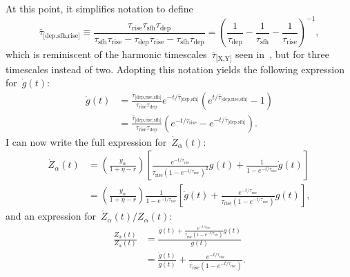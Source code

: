 \documentclass[12pt]{article}
\newcommand{\ddfrac}[2]{\frac{\displaystyle{#1}}{\displaystyle{#2}}}
\newcommand{\timescale}[1]{\ensuremath{\tau_\text{#1}}}
\newcommand{\harmonic}[2]{\ensuremath{\bar{\tau}_\text{[#1,#2]}}}
\newcommand{\hharmonic}[3]{\ensuremath{\bar{\tau}_\text{[#1,#2,#3]}}}
\begin{document}
At this point, it simplifies notation to define
\begin{equation}
\hharmonic{dep}{sfh}{rise} \equiv \frac{
	\timescale{rise}\timescale{sfh}\timescale{dep}
}{
	\timescale{sfh}\timescale{rise} - \timescale{dep}\timescale{rise} -
	\timescale{sfh}\timescale{dep}
} = \left( \frac{1}{\timescale{dep}} - \frac{1}{\timescale{sfh}} -
\frac{1}{\timescale{rise}}\right)^{-1},
\end{equation}
which is reminiscent of the harmonic timescales~$\harmonic{X}{Y}$ seen
in~\citet*{Weinberg2017}, but for three timescales instead of two.
Adopting this notation yields the following expression for~$\dot{g}(t)$:
\begin{equation}
\begin{split}
\dot{g}(t) &= \frac{
	\hharmonic{dep}{rise}{sfh}
}{
	\timescale{rise}\timescale{dep}
} e^{-t / \harmonic{dep}{sfh}} \left(e^{t /
\hharmonic{dep}{rise}{sfh}} - 1\right)
\\
&= \frac{
	\hharmonic{dep}{rise}{sfh}
}{
	\timescale{rise}\timescale{dep}
} \left(e^{-t / \timescale{rise}} - e^{-t / \harmonic{dep}{sfh}}\right).
\end{split}
\end{equation}
I can now write the full expression for~$\dot{Z}_\alpha(t)$:
\begin{subequations}\begin{align}
\dot{Z}_\alpha(t) &= \left(\frac{y_\alpha}{1 + \eta - r}\right)
\left[
\frac{e^{-t / \timescale{rise}}}{
	\timescale{rise} (1 - e^{-t / \timescale{rise}})^2
} g(t) + \frac{1}{1 - e^{-t / \timescale{rise}}} \dot{g}(t)
\right]
\\
&= \left(\frac{y_\alpha}{1 + \eta - r}\right)
\frac{1}{1 - e^{-t / \timescale{rise}}} \left[
\dot{g}(t) + \frac{
	e^{-t / \timescale{rise}}
}{
	\timescale{rise} (1 - e^{-t / \timescale{rise}})
} g(t)
\right],
\end{align}\end{subequations}
and an expression for~$\dot{Z}_\alpha(t) / Z_\alpha(t)$:
\begin{subequations}\begin{align}
\frac{\dot{Z}_\alpha(t)}{Z_\alpha(t)} &= \ddfrac{
	\dot{g}(t) + \frac{
		e^{-t / \timescale{rise}}
	}{
		\timescale{rise} (1 - e^{-t / \timescale{rise}})
	} g(t)
}{
	g(t)
}
\\
&= \frac{\dot{g}(t)}{g(t)} + \frac{
	e^{-t / \timescale{rise}}
}{
	\timescale{rise} (1 - e^{-t / \timescale{rise}})
}.
\end{align}\end{subequations}
\end{document}
